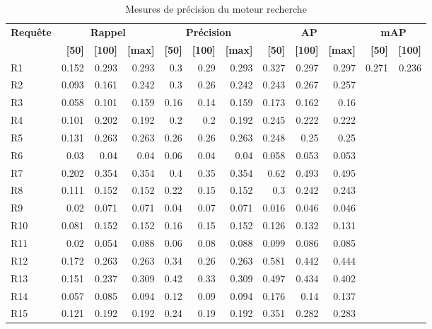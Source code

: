 \begin{table}[H]
\centering
\begin{tabular}{l|rrr|rrr|rrr|rr}
\toprule
\textbf{Requête} & \multicolumn{3}{c}{\textbf{Rappel}} & \multicolumn{3}{c}{\textbf{Précision}} & \multicolumn{3}{c}{\textbf{AP}} & \multicolumn{2}{c}{\textbf{mAP}} \\
 & \textbf{[50]} & \textbf{[100]} & \textbf{[max]} & \textbf{[50]} & \textbf{[100]} & \textbf{[max]} & \textbf{[50]} & \textbf{[100]} & \textbf{[max]} & \textbf{[50]} & \textbf{[100]} \\
\midrule
R1 & 0.152 & 0.293 & 0.293 & 0.3 & 0.29 & 0.293 & 0.327 & 0.297 & 0.297 & \multirow{15}{*}{0.271} & \multirow{15}{*}{0.236} \\
R2 & 0.093 & 0.161 & 0.242 & 0.3 & 0.26 & 0.242 & 0.243 & 0.267 & 0.257 \\
R3 & 0.058 & 0.101 & 0.159 & 0.16 & 0.14 & 0.159 & 0.173 & 0.162 & 0.16 \\
R4 & 0.101 & 0.202 & 0.192 & 0.2 & 0.2 & 0.192 & 0.245 & 0.222 & 0.222 \\
R5 & 0.131 & 0.263 & 0.263 & 0.26 & 0.26 & 0.263 & 0.248 & 0.25 & 0.25 \\
R6 & 0.03 & 0.04 & 0.04 & 0.06 & 0.04 & 0.04 & 0.058 & 0.053 & 0.053 \\
R7 & 0.202 & 0.354 & 0.354 & 0.4 & 0.35 & 0.354 & 0.62 & 0.493 & 0.495 \\
R8 & 0.111 & 0.152 & 0.152 & 0.22 & 0.15 & 0.152 & 0.3 & 0.242 & 0.243 \\
R9 & 0.02 & 0.071 & 0.071 & 0.04 & 0.07 & 0.071 & 0.016 & 0.046 & 0.046 \\
R10 & 0.081 & 0.152 & 0.152 & 0.16 & 0.15 & 0.152 & 0.126 & 0.132 & 0.131 \\
R11 & 0.02 & 0.054 & 0.088 & 0.06 & 0.08 & 0.088 & 0.099 & 0.086 & 0.085 \\
R12 & 0.172 & 0.263 & 0.263 & 0.34 & 0.26 & 0.263 & 0.581 & 0.442 & 0.444 \\
R13 & 0.151 & 0.237 & 0.309 & 0.42 & 0.33 & 0.309 & 0.497 & 0.434 & 0.402 \\
R14 & 0.057 & 0.085 & 0.094 & 0.12 & 0.09 & 0.094 & 0.176 & 0.14 & 0.137 \\
R15 & 0.121 & 0.192 & 0.192 & 0.24 & 0.19 & 0.192 & 0.351 & 0.282 & 0.283 \\
\bottomrule
\end{tabular}
\caption{Mesures de précision du moteur recherche}
\label{tab:results}
\end{table}

